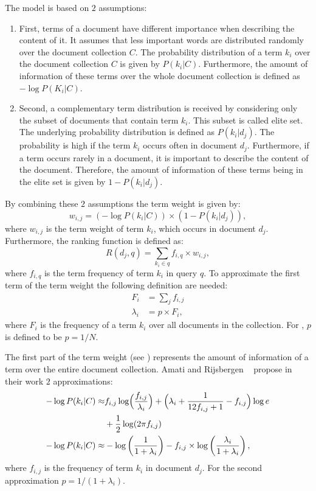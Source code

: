 The model is based on $2$ assumptions:
\begin{enumerate}
\item First, terms of a document have different importance when describing the content of it. It assumes that less important words are distributed randomly over the document collection $C$. The probability distribution of a term $k_i$ over the document collection $C$ is given by $P(k_i|C)$. Furthermore, the amount of information of these terms over the whole document collection is defined as $- \log P(K_i|C)$.
\item Second, a complementary term distribution is received by considering only the subset of documents that contain term $k_i$. This subset is called elite set. The underlying probability distribution is defined as $P(k_i|d_j)$. The probability is high if the term $k_i$ occurs often in document $d_j$. Furthermore, if a term occurs rarely in a document, it is important to describe the content of the document. Therefore, the amount of information of these terms being in the elite set is given by $1 - P(k_i|d_j)$.
\end{enumerate}
By combining these $2$ assumptions the term weight is given by:
\begin{equation}
  \label{dfr_term_weight}
  w_{i, j} = (- \log P(k_i | C)) \times (1 - P(k_i | d_j)),
\end{equation}
where $w_{i, j}$ is the term weight of term $k_i$, which occurs in document $d_j$. Furthermore, the ranking function is defined as:
\begin{equation}
  R(d_j, q) = \sum_{k_i \in q} f_{i, q} \times w_{i, j},
\end{equation}
where $f_{i, q}$ is the term frequency of term $k_i$ in query $q$. To approximate the first term of the term weight the following definition are needed:
\begin{align}
  F_i & = \sum_j f_{i, j} \\
  \label{lambda_i}
  \lambda_i & = p \times F_i,
\end{align}
where $F_i$ is the frequency of a term $k_i$ over all documents in the collection. For , $p$ is defined to be $p = 1/N$.

The first part of the term weight (see ) represents the amount of information of a term over the entire document collection. Amati and Rijsbergen ~\cite{AmatiR02} propose in their work $2$ approximations:
\begin{align}
    - \log P(k_i | C) \approx & f_{i, j} \log \Bigl( \frac{f_{i, j}}{\lambda_i} \Bigr) + \Bigl( \lambda_i + \frac{1}{12 f_{i, j} + 1} - f_{i, j}\Bigr) \log e \\
    & + \frac{1}{2} \log(2 \pi f_{i, j}) \nonumber \\
  - \log P(k_i | C) \approx & - \log \left( \frac{1}{1 + \lambda_i} \right) - f_{i, j} \times \log \left( \frac{\lambda_i}{1 + \lambda_i} \right),
\end{align}
where $f_{i, j}$ is the frequency of term $k_i$ in document $d_j$. For the second approximation $p = 1/(1 + \lambda_i)$.

